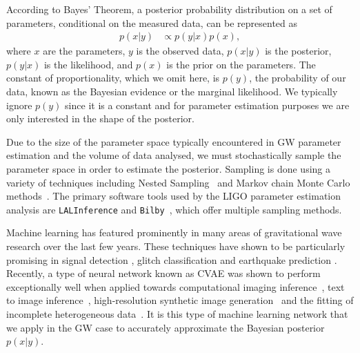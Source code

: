 \documentclass[%
showpacs,
 amsmath,amssymb,
 aps,
 twocolumn,
 prl,
 reprint,
floatfix,
]{revtex4-1}
\begin{document}
%
%
According to Bayes' Theorem, a posterior probability distribution on a set of
parameters, conditional on the measured data, can be represented as
%
\begin{align}\label{eq:bayes_theorem} 
p(x|y) &\propto p(y|x) p(x), 
\end{align}
%
where $x$ are the parameters, $y$ is the observed data, $p(x|y)$ is the
posterior, $p(y|x)$ is the likelihood, and $p(x)$ is the prior on the
parameters. The constant of proportionality, which we omit here, is
$p(y)$, the probability of our data, known as the Bayesian evidence or the
marginal likelihood. We typically ignore $p(y)$ since it is a constant and for
parameter estimation purposes we are only interested in the shape of the
posterior.

%
%
Due to the size of the parameter space typically encountered in \ac{GW}
parameter estimation and the volume of data analysed, we must stochastically
sample the parameter space in order to estimate the posterior.  Sampling is
done using a variety of techniques including Nested
Sampling~\cite{skilling2006,cpnest,dynesty} and Markov chain Monte Carlo
methods~\cite{emcee,ptemcee}. The primary software tools used by the \ac{LIGO}
parameter estimation analysis are \texttt{LALInference} and
\texttt{Bilby}~\cite{1409.7215,1811.02042}, which offer multiple sampling
methods.  
  
%
%
Machine learning has featured prominently in many areas of gravitational wave
research over the last few years. These techniques have shown to be
particularly promising in signal detection
\cite{GEORGE201864,PhysRevLett.120.141103,1904.08693}, glitch classification
\cite{1706.07446,0264-9381-34-6-064003} and earthquake prediction
\cite{Coughlin_2017}. Recently, a type of neural network known as \ac{CVAE} was
shown to perform exceptionally well when applied towards computational imaging
inference~\cite{1904.06264,NIPS2015_5775}, text to image
inference~\cite{1512.00570}, high-resolution synthetic image
generation~\cite{1612.00005} and the fitting of incomplete heterogeneous
data~\cite{1807.03653}. It is this type of machine learning network that we
apply in the \ac{GW} case to accurately approximate the Bayesian posterior
$p(x|y)$.
\end{document}
